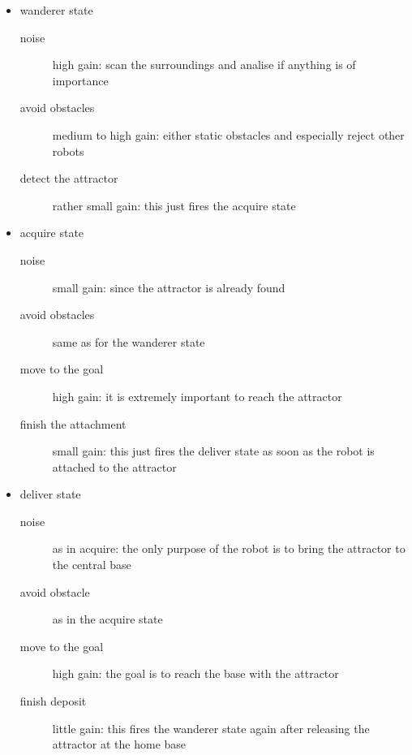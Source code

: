 \documentclass[12pt]{report}
\begin{document}
\begin{itemize}

\item wanderer state

    \begin{description}
    \item [noise] high gain: scan the surroundings and analise if anything is of importance
    \item [avoid  obstacles] medium to high gain: either static obstacles and especially reject other robots 
    \item [detect the attractor] rather small gain: this just fires the acquire state
    
    \end{description}

\item acquire state
    
    \begin{description}
    
    \item [noise] small gain:  since the attractor is already found
    \item [avoid obstacles] same as for the wanderer state
    \item [move to the goal] high gain: it is extremely important to reach the attractor
    \item [finish the attachment] small gain: this just fires the deliver state as soon as the robot is attached to the attractor

    \end{description}

\item deliver state

    \begin{description}
    
    \item [noise] as in acquire: the only purpose of the robot is to bring the attractor to the central base
    \item [avoid obstacle] as in the acquire state
    \item [move to the goal] high gain: the goal is to reach the base with the attractor
    \item [finish deposit] little gain: this fires the wanderer state again after releasing the attractor at the home base
    
    \end{description}
    
\end{itemize}
    
\end{document}
